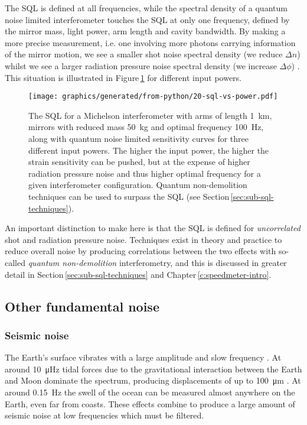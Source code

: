 The \gls{SQL} is defined at all frequencies, while the spectral density of a quantum noise limited interferometer touches the \gls{SQL} at only one frequency, defined by the mirror mass, light power, arm length and cavity bandwidth. By making a more precise measurement, i.e. one involving more photons carrying information of the mirror motion, we see a smaller shot noise spectral density (we reduce $\Delta n$) whilst we see a larger radiation pressure noise spectral density (we increase $\Delta \phi$) \cite{Caves1981}. This situation is illustrated in Figure\,\ref{fig:sql-vs-input-power} for different input powers.

\begin{figure}
  \centering
  \texttt{[image: graphics/generated/from-python/20-sql-vs-power.pdf]}
  \caption[Standard quantum limit and the quantum noise with various input powers]{\label{fig:sql-vs-input-power}The \gls{SQL} for a Michelson interferometer with arms of length \SI{1}{\kilo\meter}, mirrors with reduced mass \SI{50}{\kilo\gram} and optimal frequency \SI{100}{\hertz}, along with quantum noise limited sensitivity curves for three different input powers. The higher the input power, the higher the strain sensitivity can be pushed, but at the expense of higher radiation pressure noise and thus higher optimal frequency for a given interferometer configuration. Quantum non-demolition techniques can be used to surpass the \gls{SQL} (see Section\,\ref{sec:sub-sql-techniques}).}
\end{figure}

An important distinction to make here is that the \gls{SQL} is defined for \emph{uncorrelated} shot and radiation pressure noise. Techniques exist in theory and practice to reduce overall noise by producing correlations between the two effects with so-called \emph{quantum non-demolition} interferometry, and this is discussed in greater detail in Section\,\ref{sec:sub-sql-techniques} and Chapter\,\ref{c:speedmeter-intro}.

\subsection{Other fundamental noise}

\subsubsection{\label{sec:seismic-noise}Seismic noise}
The Earth's surface vibrates with a large amplitude and slow frequency \cite{ET2011}. At around \SI{10}{\micro\hertz} tidal forces due to the gravitational interaction between the Earth and Moon dominate the spectrum, producing displacements of up to \SI{100}{\micro\meter} \cite{Adhikari2004}. At around \SI{0.15}{\hertz} the swell of the ocean can be measured almost anywhere on the Earth, even far from coasts. These effects combine to produce a large amount of seismic noise at low frequencies which must be filtered.

